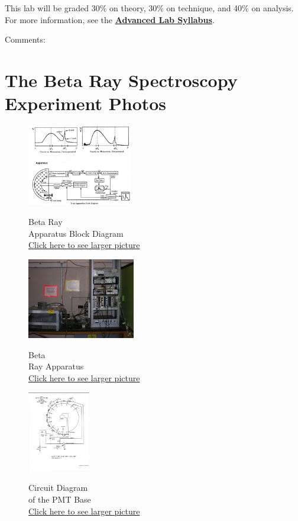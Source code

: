 \documentclass{../lab}
\begin{document}
This lab will be graded 30\% on theory, 30\% on technique, and 40\% on analysis. For more information, see the \href{\AdvancedLabSyllabus}{\textbf{Advanced Lab Syllabus}}.

Comments: \Feedback

\section{The Beta Ray Spectroscopy Experiment Photos}

\begin{figure}[H]
\captionsetup{justification=centering}
  \href{http://experimentationlab.berkeley.edu/sites/default/files/images/Bra_1.jpg}{\includegraphics[height=100pt,keepaspectratio]{images/Bra_1.jpg}}
  \caption{Beta Ray \\ Apparatus Block Diagram \\ \href{http://experimentationlab.berkeley.edu/sites/default/files/images/Bra_1.jpg}{Click here to see larger picture}}
  \label{fig:BRayBlock}
\endminipage\hfill
{}
 \href{http://experimentationlab.berkeley.edu/sites/default/files/images/BRA_Rack_1.jpg}{\includegraphics[height=100pt,keepaspectratio]{images/BRA_Rack_1.jpg}}
  \caption{Beta \\ Ray Apparatus\\ \href{http://experimentationlab.berkeley.edu/sites/default/files/images/BRA_Rack_1.jpg}{Click here to see larger picture}}\label{fig:BRayApparatus}
\endminipage\hfill
{}
\centering
  \href{http://experimentationlab.berkeley.edu/sites/default/files/images/RCA6655A_PMT_3.jpg}{\includegraphics[height=100pt,keepaspectratio]{images/RCA6655A_PMT_3.jpg}}
  \caption{Circuit Diagram \\ of the PMT Base \\
  \href{http://experimentationlab.berkeley.edu/sites/default/files/images/RCA6655A_PMT_3.jpg}{Click here to see larger picture}}
  \label{fig:BRayTube}
\endminipage
\end{figure}
\end{document}
